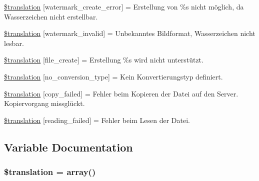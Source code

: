 \begin{DoxyCompactItemize}
\item 
\hyperlink{class_8upload_8de___d_e_8php_aabca0b65dadbc6184415c16375f284ca}{\$translation} \mbox{[}\textquotesingle{}watermark\+\_\+create\+\_\+error\textquotesingle{}\mbox{]} = \textquotesingle{}Erstellung von \%s nicht möglich, da Wasserzeichen nicht erstellbar.\textquotesingle{}
\item 
\hyperlink{class_8upload_8de___d_e_8php_ac336e7a5701e47ba4a05e9e498a3cc44}{\$translation} \mbox{[}\textquotesingle{}watermark\+\_\+invalid\textquotesingle{}\mbox{]} = \textquotesingle{}Unbekanntes Bildformat, Wasserzeichen nicht lesbar.\textquotesingle{}
\item 
\hyperlink{class_8upload_8de___d_e_8php_a1ecb4673e4fb69e06b3f20b65cecf30a}{\$translation} \mbox{[}\textquotesingle{}file\+\_\+create\textquotesingle{}\mbox{]} = \textquotesingle{}Erstellung \%s wird nicht unterstützt.\textquotesingle{}
\item 
\hyperlink{class_8upload_8de___d_e_8php_a4712d7ec28e9a7f17eb3338af2358363}{\$translation} \mbox{[}\textquotesingle{}no\+\_\+conversion\+\_\+type\textquotesingle{}\mbox{]} = \textquotesingle{}Kein Konvertierungstyp definiert.\textquotesingle{}
\item 
\hyperlink{class_8upload_8de___d_e_8php_a783c9358bcf54a054545b50098bc679b}{\$translation} \mbox{[}\textquotesingle{}copy\+\_\+failed\textquotesingle{}\mbox{]} = \textquotesingle{}Fehler beim Kopieren der Datei auf den Server. Kopiervorgang missglückt.\textquotesingle{}
\item 
\hyperlink{class_8upload_8de___d_e_8php_a01bea14c9fd5f353f62db44beabfcd42}{\$translation} \mbox{[}\textquotesingle{}reading\+\_\+failed\textquotesingle{}\mbox{]} = \textquotesingle{}Fehler beim Lesen der Datei.\textquotesingle{}
\end{DoxyCompactItemize}


\subsection{Variable Documentation}
\hypertarget{class_8upload_8de___d_e_8php_a1f198d410fecc3871ebdd468d343a5e3}{}
\subsubsection[{\$translation}]{\setlength{\rightskip}{0pt plus 5cm}\$translation = array()}\label{class_8upload_8de___d_e_8php_a1f198d410fecc3871ebdd468d343a5e3}
\hypertarget{class_8upload_8de___d_e_8php_ac7498e49b9771b04698029aa61c70821}{}
